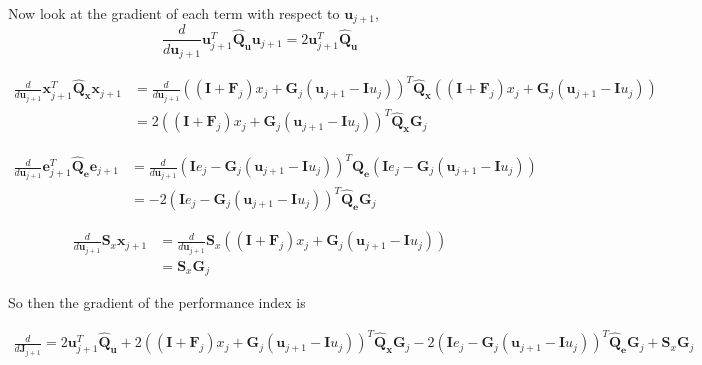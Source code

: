 \documentclass{article}
\begin{document}
Now look at the gradient of each term with respect to $\mathbf{u}_{j+1}$,
\begin{equation}
\frac{d}{d\mathbf{u}_{j+1}} \mathbf{u}_{j+1}^T \mathbf{\hat{Q}_u} \mathbf{u}_{j+1}  
= 2 \mathbf{u}_{j+1}^T \mathbf{\hat{Q}_u} 
\end{equation}

\begin{align}
\frac{d}{d\mathbf{u}_{j+1}}\mathbf{x}_{j+1}^T \mathbf{\hat{Q}_x} \mathbf{x}_{j+1}  
& = \frac{d}{d\mathbf{u}_{j+1}}\left( \left(\mathbf{I} +\mathbf{F}_j \right)x_j + \mathbf{G}_j \left(\mathbf{u}_{j+1} - \mathbf{I}u_j \right) \right)^T \mathbf{\hat{Q}_x} \left( \left(\mathbf{I} +\mathbf{F}_j \right)x_j + \mathbf{G}_j \left(\mathbf{u}_{j+1} - \mathbf{I}u_j \right) \right) \\
& =2 \left( \left(\mathbf{I} +\mathbf{F}_j \right)x_j + \mathbf{G}_j \left(\mathbf{u}_{j+1} - \mathbf{I}u_j \right) \right)^T \mathbf{\hat{Q}_x}\mathbf{G}_j 
\end{align}

\begin{align}
\frac{d}{d\mathbf{u}_{j+1}} \mathbf{e}_{j+1}^T \mathbf{\hat{Q}_e} \mathbf{e}_{j+1} 
& = \frac{d}{d\mathbf{u}_{j+1}} \left( \mathbf{I} e_j - \mathbf{G}_j \left(\mathbf{u}_{j+1} - \mathbf{I}u_j \right)\right)^T \mathbf{\hat{Q}_e} \left( \mathbf{I} e_j - \mathbf{G}_j \left(\mathbf{u}_{j+1} - \mathbf{I}u_j \right) \right) \\
& = - 2  \left( \mathbf{I} e_j - \mathbf{G}_j \left(\mathbf{u}_{j+1} - \mathbf{I}u_j \right)\right)^T \mathbf{\hat{Q}_e} \mathbf{G}_j
\end{align}

\begin{align}
\frac{d}{d\mathbf{u}_{j+1}} \mathbf{S}_x \mathbf{x}_{j+1} 
& = \frac{d}{d\mathbf{u}_{j+1}} \mathbf{S}_x \left(\left(\mathbf{I} +\mathbf{F}_j \right)x_j + \mathbf{G}_j \left(\mathbf{u}_{j+1} - \mathbf{I}u_j \right)\right)\\
& =  \mathbf{S}_x  \mathbf{G}_j
\end{align}

So then the gradient of the performance index is

\begin{align}
\frac{d}{d\mathbf{J}_{j+1}} 
= 2 \mathbf{u}_{j+1}^T \mathbf{\hat{Q}_u} 
+ 2 \left( \left(\mathbf{I} +\mathbf{F}_j \right)x_j + \mathbf{G}_j \left(\mathbf{u}_{j+1} - \mathbf{I}u_j \right) \right)^T \mathbf{\hat{Q}_x}\mathbf{G}_j
- 2  \left( \mathbf{I} e_j - \mathbf{G}_j \left(\mathbf{u}_{j+1} - \mathbf{I}u_j \right)\right)^T \mathbf{\hat{Q}_e} \mathbf{G}_j
+ \mathbf{S}_x  \mathbf{G}_j
\end{align}
\end{document}
